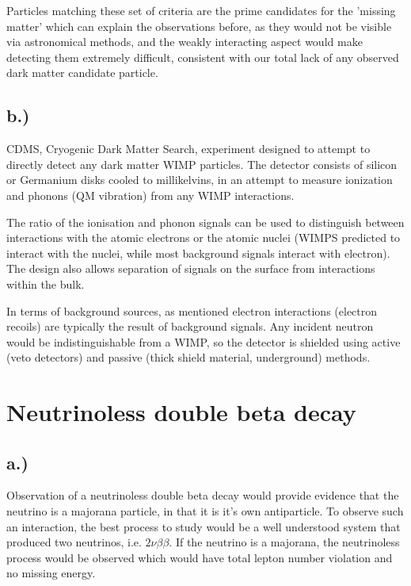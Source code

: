 \documentclass[]{article}
\begin{document}
	Particles matching these set of criteria are the prime candidates for the 'missing matter' which can explain the observations before, as they would not be visible via astronomical methods, and the weakly interacting aspect would make detecting them extremely difficult, consistent with our total lack of any observed dark matter candidate particle.
	
	\subsection{b.) }
	
	CDMS, Cryogenic Dark Matter Search, experiment designed to attempt to directly detect any dark matter WIMP particles. The detector consists of silicon or Germanium disks cooled to millikelvins, in an attempt to measure ionization and phonons (QM vibration) from any WIMP interactions.
	
	The ratio of the ionisation and phonon signals can be used to distinguish between interactions with the atomic electrons or the atomic nuclei (WIMPS predicted to interact with the nuclei, while most background signals interact with electron). The design also allows separation of signals on the surface from interactions within the bulk. 
	
	In terms of background sources, as mentioned electron interactions (electron recoils) are typically the result of background signals. Any incident neutron would be indistinguishable from a WIMP, so the detector is shielded using active (veto detectors) and passive (thick shield material, underground) methods.
	
	\section{Neutrinoless double beta decay}
	
		\subsection{a.)}
		
			Observation of a neutrinoless double beta decay would provide evidence that the neutrino is a majorana particle, in that it is it's own antiparticle. To observe such an interaction, the best process to study would be a well understood system that produced two neutrinos, i.e. $2\nu\beta\beta$. If the neutrino is a majorana, the neutrinoless process would be observed which would have total lepton number violation and no missing energy. 
			
\end{document}
